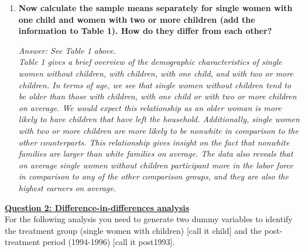 \documentclass{article}
\begin{document}
\begin{enumerate}
\item \textbf{Now calculate the sample means separately for single women with one child and women with two or more children (add the information to Table 1). How do they differ from each other?}

\textit{Answer: See Table 1 above.\\
Table 1 gives a brief overview of the demographic characteristics of single women without children, with children, with one child, and with two or more children. In terms of age, we see that single women without children tend to be older than those with children, with one child or with two or more children on average. We would expect this relationship as an older woman is more likely to have children that have left the household. Additionally, single women with two or more children are more likely to be nonwhite in comparison to the other counterparts. This relationship gives insight on the fact that nonwhite families are larger than white families on average. The data also reveals that on average single women without children participant more in the labor force in comparison to any of the other comparison groups, and they are also the highest earners on average.  }

\end{enumerate}


\textbf{\underline{Question 2: Difference-in-differences analysis}}\\

\bigskip
For the following analysis you need to generate two dummy variables to identify the treatment group (single women with children) [call it child] and the post-treatment period (1994-1996) [call it post1993].
\end{document}
